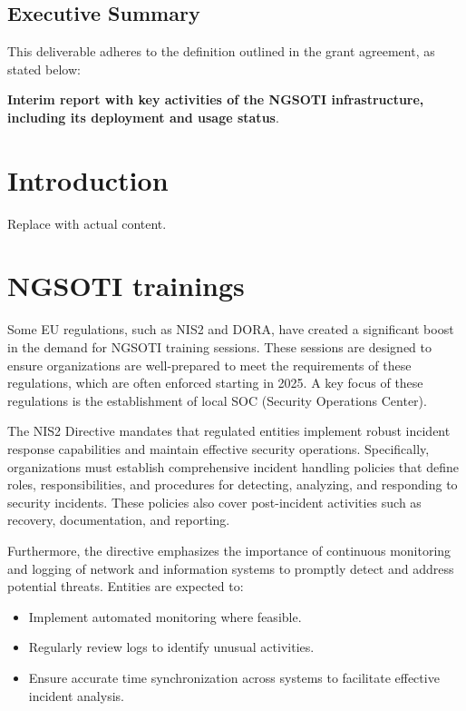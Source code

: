 \section*{Executive Summary}

This deliverable adheres to the definition outlined in the grant agreement, as stated below:

\textbf{ Interim report with key activities of the NGSOTI infrastructure, including its deployment and usage status}.


\chapter{Introduction}
Replace with actual content.

\chapter{NGSOTI trainings}
Some EU regulations, such as NIS2 and DORA, have created a significant boost in the demand for NGSOTI training sessions. These sessions are designed to ensure organizations are well-prepared to meet the requirements of these regulations, which are often enforced starting in 2025. A key focus of these regulations is the establishment of local SOC (Security Operations Center).

The NIS2 Directive mandates that regulated entities implement robust incident response capabilities and maintain effective security operations. Specifically, organizations must establish comprehensive incident handling policies that define roles, responsibilities, and procedures for detecting, analyzing, and responding to security incidents. These policies also cover post-incident activities such as recovery, documentation, and reporting.

Furthermore, the directive emphasizes the importance of continuous monitoring and logging of network and information systems to promptly detect and address potential threats. Entities are expected to:

\begin{itemize}
    \item Implement automated monitoring where feasible.
    \item Regularly review logs to identify unusual activities.
    \item Ensure accurate time synchronization across systems to facilitate effective incident analysis.
\end{itemize}

